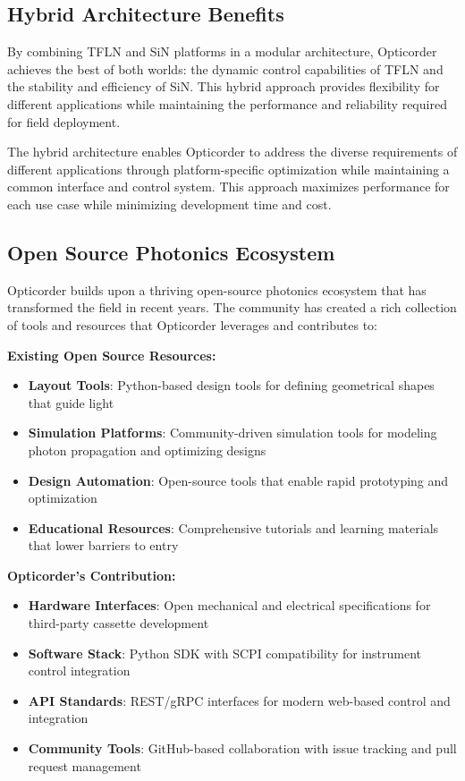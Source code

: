 \documentclass[11pt,a4paper]{article}
\begin{document}
\subsection{Hybrid Architecture Benefits}
By combining TFLN and SiN platforms in a modular architecture, Opticorder achieves the best of both worlds: the dynamic control capabilities of TFLN and the stability and efficiency of SiN. This hybrid approach provides flexibility for different applications while maintaining the performance and reliability required for field deployment.

The hybrid architecture enables Opticorder to address the diverse requirements of different applications through platform-specific optimization while maintaining a common interface and control system. This approach maximizes performance for each use case while minimizing development time and cost.

\subsection{Open Source Photonics Ecosystem}
Opticorder builds upon a thriving open-source photonics ecosystem that has transformed the field in recent years. The community has created a rich collection of tools and resources that Opticorder leverages and contributes to:

\textbf{Existing Open Source Resources:}
\begin{itemize}
\item \textbf{Layout Tools}: Python-based design tools for defining geometrical shapes that guide light
\item \textbf{Simulation Platforms}: Community-driven simulation tools for modeling photon propagation and optimizing designs
\item \textbf{Design Automation}: Open-source tools that enable rapid prototyping and optimization
\item \textbf{Educational Resources}: Comprehensive tutorials and learning materials that lower barriers to entry
\end{itemize}

\textbf{Opticorder's Contribution:}
\begin{itemize}
\item \textbf{Hardware Interfaces}: Open mechanical and electrical specifications for third-party cassette development
\item \textbf{Software Stack}: Python SDK with SCPI compatibility for instrument control integration
\item \textbf{API Standards}: REST/gRPC interfaces for modern web-based control and integration
\item \textbf{Community Tools}: GitHub-based collaboration with issue tracking and pull request management
\end{itemize}
\end{document}
